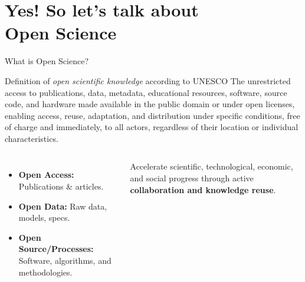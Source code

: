 \documentclass[aspectratio=169]{beamer}
\begin{document}
\section{Yes! So let's talk about \\ Open Science}

\begin{frame}{What is Open Science?}
  \begin{block}{Definition of \textit{open scientific knowledge} according to UNESCO}
     The unrestricted access to publications, data, metadata, educational resources, software, source code, and hardware made available in the public domain or under open licenses, enabling access, reuse, adaptation, and distribution under specific conditions, free of charge and immediately, to all actors, regardless of their location or individual characteristics.
  \end{block}

  \vspace{1em}
  \begin{columns}[T,onlytextwidth]
      \begin{itemize}
          \item \textbf{Open Access:} Publications \& articles.
          \item \textbf{Open Data:} Raw data, models, specs.
          \item \textbf{Open Source/Processes:} Software, algorithms, and methodologies.
      \end{itemize}

      \vspace{.5em}
      
      Accelerate scientific, technological, economic, and social progress through active \textbf{collaboration and knowledge reuse}.
  \end{columns}
\end{frame}
\end{document}
